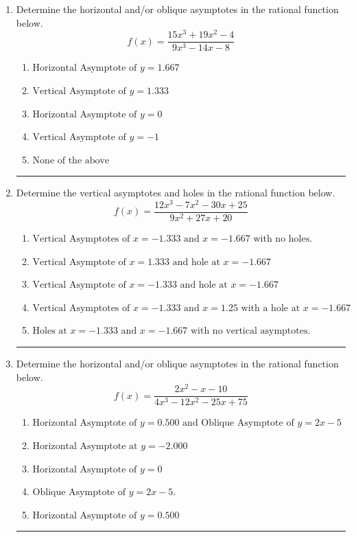 \documentclass[14pt]{extbook}
\newcommand{\litem}[1]{\item#1\hspace*{-1cm}\rule{\textwidth}{0.4pt}}
\begin{document}
\begin{enumerate}
{\begin{enumerate}[label=\Alph*.]
\end{enumerate} }
\litem{
Determine the horizontal and/or oblique asymptotes in the rational function below.\[ f(x) = \frac{15x^{3} +19 x^{2} -4}{9x^{3} -14 x -8} \]\begin{enumerate}[label=\Alph*.]
\item \( \text{Horizontal Asymptote of } y = 1.667  \)
\item \( \text{Vertical Asymptote of } y = 1.333  \)
\item \( \text{Horizontal Asymptote of } y = 0  \)
\item \( \text{Vertical Asymptote of } y = -1  \)
\item \( \text{None of the above} \)

\end{enumerate} }
\litem{
Determine the vertical asymptotes and holes in the rational function below.\[ f(x) = \frac{12x^{3} -7 x^{2} -30 x + 25}{9x^{2} +27 x + 20} \]\begin{enumerate}[label=\Alph*.]
\item \( \text{Vertical Asymptotes of } x = -1.333 \text{ and } x = -1.667 \text{ with no holes.} \)
\item \( \text{Vertical Asymptote of } x = 1.333 \text{ and hole at } x = -1.667 \)
\item \( \text{Vertical Asymptote of } x = -1.333 \text{ and hole at } x = -1.667 \)
\item \( \text{Vertical Asymptotes of } x = -1.333 \text{ and } x = 1.25 \text{ with a hole at } x = -1.667 \)
\item \( \text{Holes at } x = -1.333 \text{ and } x = -1.667 \text{ with no vertical asymptotes.} \)

\end{enumerate} }
\litem{
Determine the horizontal and/or oblique asymptotes in the rational function below.\[ f(x) = \frac{2x^{2} -x -10}{4x^{3} -12 x^{2} -25 x + 75} \]\begin{enumerate}[label=\Alph*.]
\item \( \text{Horizontal Asymptote of } y = 0.500 \text{ and Oblique Asymptote of } y = 2x -5 \)
\item \( \text{Horizontal Asymptote at } y = -2.000 \)
\item \( \text{Horizontal Asymptote of } y = 0 \)
\item \( \text{Oblique Asymptote of } y = 2x -5. \)
\item \( \text{Horizontal Asymptote of } y = 0.500  \)


\end{enumerate}}
\end{enumerate}
\end{document}
